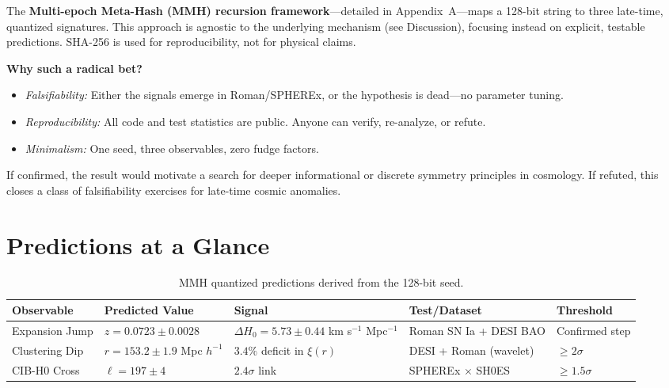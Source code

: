 \documentclass[11pt,a4paper]{article}
\begin{document}
The \textbf{Multi-epoch Meta-Hash (MMH) recursion framework}---detailed in Appendix~A---maps a 128-bit string to three late-time, quantized signatures. This approach is agnostic to the underlying mechanism (see Discussion), focusing instead on explicit, testable predictions. SHA-256 is used for reproducibility, not for physical claims.

\vspace{0.6em}
\noindent\textbf{Why such a radical bet?}
\begin{itemize}
    \item \textit{Falsifiability:} Either the signals emerge in Roman/SPHEREx, or the hypothesis is dead---no parameter tuning.
    \item \textit{Reproducibility:} All code and test statistics are public. Anyone can verify, re-analyze, or refute.
    \item \textit{Minimalism:} One seed, three observables, zero fudge factors.
\end{itemize}

If confirmed, the result would motivate a search for deeper informational or discrete symmetry principles in cosmology. If refuted, this closes a class of falsifiability exercises for late-time cosmic anomalies.

\FloatBarrier
\section{Predictions at a Glance}

\FloatBarrier
\begin{table}[htbp]
\centering
\begin{tabular}{p{2.8cm} p{3cm} p{3.5cm} p{3.8cm} p{2.1cm}}
\hline
\textbf{Observable} & \textbf{Predicted Value} & \textbf{Signal} & \textbf{Test/Dataset} & \textbf{Threshold} \\
\hline
Expansion Jump   & $z = 0.0723 \pm 0.0028$         & $\Delta H_0 = 5.73 \pm 0.44$ km s$^{-1}$ Mpc$^{-1}$ & Roman SN Ia + DESI BAO         & Confirmed step   \\
Clustering Dip   & $r = 153.2 \pm 1.9$ Mpc $h^{-1}$ & $3.4\%$ deficit in $\xi(r)$                         & DESI + Roman (wavelet)         & $\geq 2\sigma$   \\
CIB-H0 Cross  & $\ell = 197 \pm 4$              & $2.4\sigma$ link                                    & SPHEREx $\times$ SH0ES         & $\geq 1.5\sigma$ \\
\hline
\end{tabular}
\caption{MMH quantized predictions derived from the 128-bit seed.}
\label{tab:predictions}
\end{table}
\FloatBarrier
\end{document}
